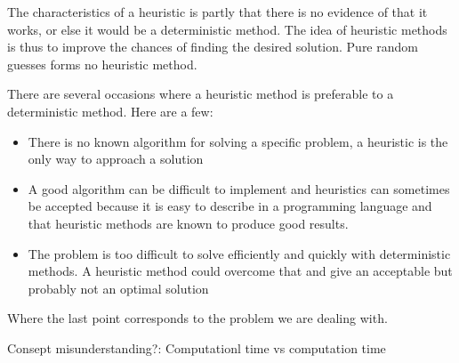 The characteristics of a heuristic is partly that there is no evidence of that it works, or else it would be a deterministic method. The idea of heuristic methods is thus to improve the chances of finding the desired solution. Pure random guesses forms no heuristic method.
 
There are several occasions where a heuristic method is preferable to a deterministic method.
Here are a few:
 
\begin{itemize}
\item There is no known algorithm for solving a specific problem, a heuristic is the only way to approach a solution
\item A good algorithm can be difficult to implement and heuristics can sometimes be accepted because it is easy to describe in a programming language and that heuristic methods are known to produce good results.

\item The problem is too difficult to solve efficiently and quickly with deterministic methods. A heuristic method could overcome that and give an acceptable but probably not an optimal solution

\end{itemize}
 
Where the last point corresponds to the problem we are dealing with.
 
Consept misunderstanding?:
Computationl time vs computation time
